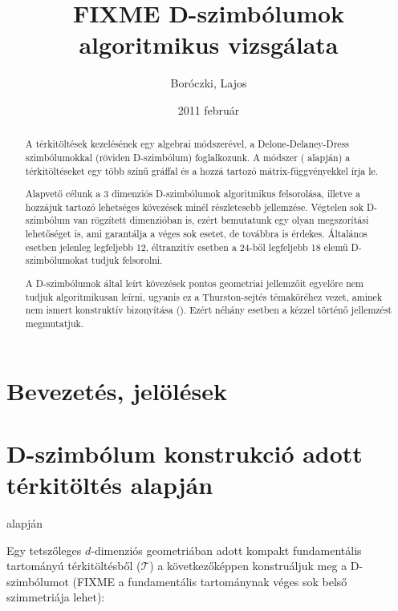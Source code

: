 \documentclass[12pt,magyar,a4paper]{article}
\begin{document}
\title{FIXME D-szimbólumok algoritmikus vizsgálata}
\author{Boróczki, Lajos}
\date{2011 február}
\maketitle

\begin{abstract}
  A térkitöltések kezelésének egy algebrai módszerével, a Delone-Delaney-Dress
  szimbólumokkal (röviden D-szimbólum) foglalkozunk. A módszer (\cite{xy}
  alapján) a térkitöltéseket egy több színű gráffal és a hozzá tartozó
  mátrix-függvényekkel írja le.

  Alapvető célunk a 3 dimenziós D-szimbólumok algoritmikus felsorolása, illetve
  a hozzájuk tartozó lehetséges kövezések minél részletesebb jellemzése.
  Végtelen sok D-szimbólum van rögzített dimenzióban is, ezért bemutatunk egy
  olyan megszorítási lehetőséget is, ami garantálja a véges sok esetet, de
  továbbra is érdekes. Általános esetben jelenleg legfeljebb 12, éltranzitív
  esetben a 24-ből legfeljebb 18 elemű D-szimbólumokat tudjuk felsorolni.

  A D-szimbólumok által leírt kövezések pontos geometriai jellemzőit egyelőre
  nem tudjuk algoritmikusan leírni, ugyanis ez a Thurston-sejtés témaköréhez
  vezet, aminek nem ismert konstruktív bizonyítása (\cite{xy}). Ezért
  néhány esetben a kézzel történő jellemzést megmutatjuk.
\end{abstract}

\section{Bevezetés, jelölések}



\section{D-szimbólum konstrukció adott térkitöltés alapján}
\cite{xy} alapján

Egy tetszőleges $d$-dimenziós geometriában adott kompakt fundamentális
tartományú térkitöltésből ($\mathcal{T}$) a következőképpen konstruáljuk meg a
D-szimbólumot (FIXME a fundamentális tartománynak véges sok belső szimmetriája
lehet):
\end{document}

